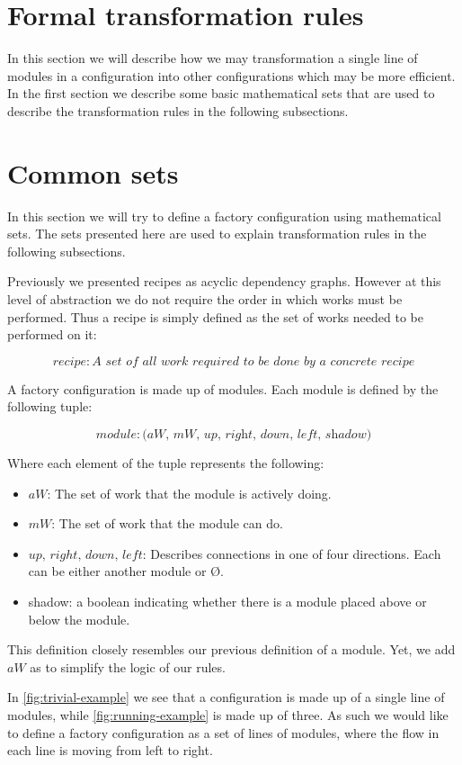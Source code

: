 \section{Formal transformation rules}
In this section we will describe how we may transformation a single line of modules in a configuration into other configurations which may be more efficient. In the first section we describe some basic mathematical sets that are used to describe the transformation rules in the following subsections.

\section{Common sets} 
In this section we will try to define a factory configuration using mathematical sets. The sets presented here are used to explain transformation rules in the following subsections.

Previously we presented recipes as acyclic dependency graphs. However at this level of abstraction we do not require the order in which works must be performed. Thus a recipe is simply defined as the set of works needed to be performed on it: 

\[recipe: \textit{A set of all work required to be done by a concrete recipe}\]

A factory configuration is made up of modules. Each module is defined by the following tuple:

\[module: \textit{(aW, mW, up, right, down, left, shadow)}\]

\noindent Where each element of the tuple represents the following:
\begin{itemize}
\item $aW$: The set of work that the module is actively doing.
\item $mW$: The set of work that the module can do.
\item $up,\, right,\, down,\, left$: Describes connections in one of four directions. Each can be either another module or $Ø$.
\item shadow: a boolean indicating whether there is a module placed above or below the module.
\end{itemize}

This definition closely resembles our previous definition of a module. Yet, we add $aW$ as to simplify the logic of our rules. 


In \cref{fig:trivial-example} we see that a configuration is made up of a single line of modules, while \cref{fig:running-example} is made up of three. As such we would like to define a factory configuration as a set of lines of modules, where the flow in each line is moving from left to right.


